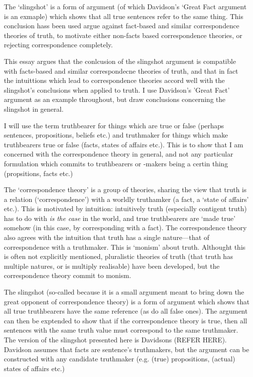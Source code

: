 The `slingshot' is a form of argument (of which Davidson's `Great Fact argument is an exmaple) which shows that all true sentences refer to the same thing.
This conclusion hass been used argue against fact-based and similar correspondence theories of truth, to motivate either non-facts based correspondence theories, or rejecting correspondence completely.

This essay argues that the conlcusion of the slingshot argument is compatible with facts-based and similar correspondecne theories of truth, and that in fact the intuittions which lead to correspondence theories accord well with the slingshot's conclusions when applied to truth.
I use Davidson's 'Great Fact' argument as an example throughout, but draw conclusions concerning the slingshot in general.

I will use the term truthbearer for things which are true or false (perhaps sentences, propositions, beliefs etc.) and truthmaker for things which make truthbearers true or false (facts, states of affairs etc.).
This is to show that I am concerned with the correspondence theory in general, and not any particular formulation which commits to truthbearers or -makers being a certin thing (propsitions, facts etc.)

The `correspondence theory' is a group of theories, sharing the view that truth is a relation (`correspondence') with a worldly truthamker (a fact, a `state of affairs' etc.).
This is motivated by intuition: intuitively truth  (especially contigent truth) has to do with \emph{is the case} in the world, and true truthbearers are `made true' somehow (in this case, by corresponding with a fact).
The correspondence theory also agrees with the intuition that truth has a single nature---that of correspondence with a truthmaker.
This is `monism' about truth.
Althought this is often not explicitly mentioned, pluralistic theories of truth (that truth has multiple natures, or is multiply realisable) have been developed, but the correspondence theory commit to monism.

The slingshot (so-called because it is a small argument meant to bring down the great opponent of correspondence theory) is a form of argument which shows that all true truthbearers have the same reference (as do all false ones).
The argument can then be exptended to show that if the correspondence theory is true, then all sentences with the same truth value must correspond to the same truthmaker.
The version of the slingshot presented here is Davidsons (REFER HERE).
Davidson assumes that facts are sentence's truthmakers, but the argument can be constructed  with any candidate truthmaker (e.g. (true) propositions, (actual) states of affairs etc.)
\parencite[752]{Davidson_1969} 

